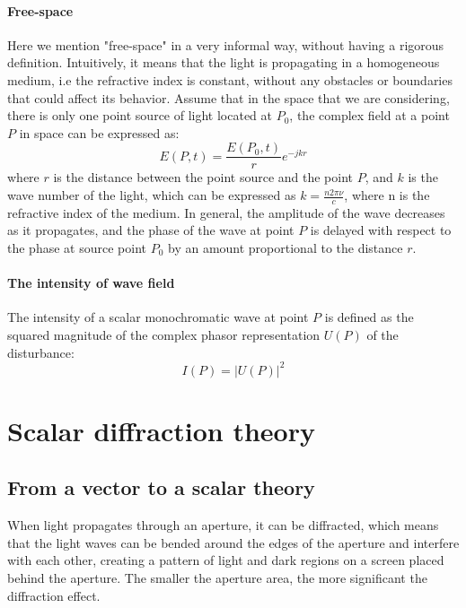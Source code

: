 \documentclass{article}
\begin{document}
\paragraph{Free-space} Here we mention "free-space" in a very informal way, without having a rigorous definition.
Intuitively, it means that the light is propagating in a homogeneous medium, i.e the refractive index is constant, without any obstacles or boundaries that could affect its behavior.
Assume that in the space that we are considering, there is only one point source of light located at $P_0$, the complex field at a point $P$ in space can be expressed as:
\begin{equation}\label{eq:free_space}
E(P, t) = \frac{E(P_0, t)}{r} e^{-jkr}
\end{equation}
where $r$ is the distance between the point source and the point $P$, and $k$ is the wave number of the light, which can be expressed as $k = \frac{n 2 \pi \nu}{c}$, where n is the refractive index of the medium. 
In general, the amplitude of the wave decreases as it propagates, and the phase of the wave at point $P$ is delayed with respect to the phase at source point $P_0$ by an amount proportional to the distance $r$.

\paragraph{The intensity of wave field} The intensity of a scalar monochromatic wave at point $P$ is defined as the squared magnitude of the complex phasor representation $U(P)$ of the disturbance:
\begin{equation}
I(P) = |U(P)|^2
\end{equation}

\section{Scalar diffraction theory}\label{sec:diffraction}

\subsection{From a vector to a scalar theory}
When light propagates through an aperture, it can be diffracted, which means that the light waves can be bended around the edges of the aperture and interfere with each other, creating a pattern of light and dark regions on a screen placed behind the aperture. The smaller the aperture area, the more significant the diffraction effect.
\end{document}
